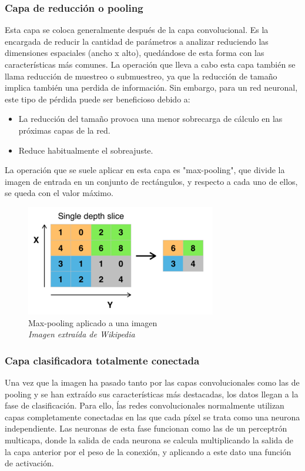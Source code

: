 \subsubsection{Capa de reducción o pooling}
Esta capa se coloca generalmente después de la capa convolucional. Es la encargada de reducir la cantidad de parámetros a analizar reduciendo las dimensiones espaciales (ancho x alto), quedándose de esta forma con las características más comunes. La operación que lleva a cabo esta capa también se llama reducción de muestreo o submuestreo, ya que la reducción de tamaño implica también una perdida de información. Sin embargo, para un red neuronal, este tipo de pérdida puede ser beneficioso debido a:
\begin{itemize}
\item La reducción del tamaño provoca una menor sobrecarga de cálculo en las próximas capas de la red.
\item Reduce habitualmente el sobreajuste.
\end{itemize}
La operación que se suele aplicar en esta capa es "max-pooling", que divide la imagen de entrada en un conjunto de rectángulos, y respecto a cada uno de ellos, se queda con el valor máximo.
\begin{figure}[htp]
\centering
\includegraphics[scale=0.7]{images/max_pooling.png}
\caption{Max-pooling aplicado a una imagen\\\textit{Imagen extraída de Wikipedia}}
\end{figure}
\subsubsection{Capa clasificadora totalmente conectada}
Una vez que la imagen ha pasado tanto por las capas convolucionales como las de pooling y se han extraído sus características más destacadas, los datos llegan a la fase de clasificación. Para ello, ĺas redes convolucionales normalmente utilizan capas completamente conectadas en las que cada píxel se trata como una neurona independiente. Las neuronas de esta fase funcionan como las de un perceptrón multicapa, donde la salida de cada neurona se calcula multiplicando la salida de la capa anterior por el peso de la conexión, y aplicando a este dato una función de activación.

